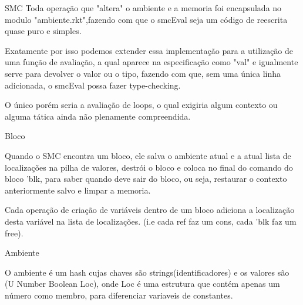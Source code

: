 \documentclass{beamer}
\begin{document}
\begin{frame}{SMC}
Toda operação que "altera" o ambiente e a memoria foi encapsulada no modulo "ambiente.rkt",fazendo com que o smcEval seja um código de reescrita quase puro e simples.

Exatamente por isso podemos extender essa implementação para a utilização de uma função de avaliação, a qual aparece na especificação como "val" e igualmente serve para devolver o valor ou o tipo, fazendo com que, sem uma única linha adicionada, o smcEval possa fazer type-checking. 

O único porém seria a avaliação de loops, o qual exigiria algum contexto ou alguma tática ainda não plenamente compreendida.
\end{frame}

\begin{frame}{Bloco}

Quando o SMC encontra um bloco, ele salva o ambiente atual e a atual lista de localizações na pilha de valores, destrói o bloco e coloca no final do comando do bloco 'blk, para saber quando deve sair do bloco, ou seja, restaurar o contexto anteriormente salvo e limpar a memoria.
 
Cada operação de criação de variáveis dentro de um bloco adiciona a localização desta variável na lista de localizações. (i.e cada ref faz um cons, cada 'blk faz um free).
\end{frame}


\begin{frame}{Ambiente}

O ambiente é um hash cujas chaves são strings(identificadores) e os valores são (U Number Boolean Loc), onde Loc é uma estrutura que contém apenas um número como membro,
para diferenciar variaveis de constantes.

\end{frame}
\end{document}
